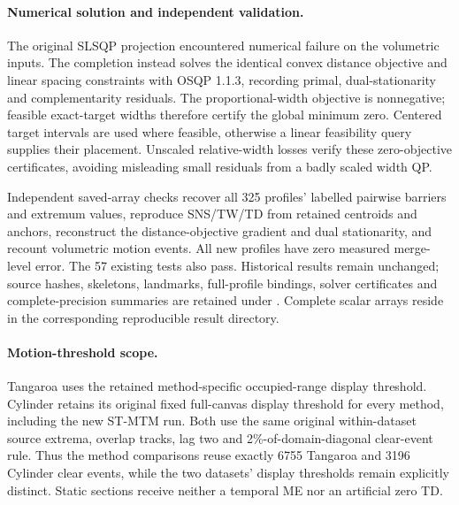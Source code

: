 \paragraph{Numerical solution and independent validation.}
The original SLSQP projection encountered numerical failure on the volumetric inputs. The completion instead solves the identical convex distance objective and linear spacing constraints with OSQP 1.1.3, recording primal, dual-stationarity and complementarity residuals. The proportional-width objective is nonnegative; feasible exact-target widths therefore certify the global minimum zero. Centered target intervals are used where feasible, otherwise a linear feasibility query supplies their placement. Unscaled relative-width losses verify these zero-objective certificates, avoiding misleading small residuals from a badly scaled width QP.

Independent saved-array checks recover all 325 profiles' labelled pairwise barriers and extremum values, reproduce SNS/TW/TD from retained centroids and anchors, reconstruct the distance-objective gradient and dual stationarity, and recount volumetric motion events. All new profiles have zero measured merge-level error. The 57 existing tests also pass. Historical results remain unchanged; source hashes, skeletons, landmarks, full-profile bindings, solver certificates and complete-precision summaries are retained under . Complete scalar arrays reside in the corresponding reproducible result directory.

\paragraph{Motion-threshold scope.}
Tangaroa uses the retained method-specific occupied-range display threshold. Cylinder retains its original fixed full-canvas display threshold for every method, including the new ST-MTM run. Both use the same original within-dataset source extrema, overlap tracks, lag two and 2\%-of-domain-diagonal clear-event rule. Thus the method comparisons reuse exactly 6755 Tangaroa and 3196 Cylinder clear events, while the two datasets' display thresholds remain explicitly distinct. Static sections receive neither a temporal ME nor an artificial zero TD.
